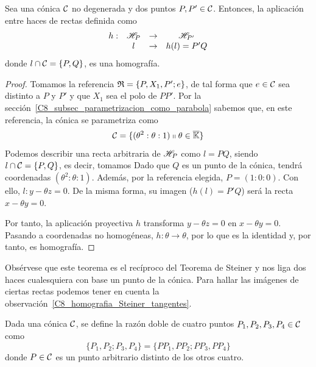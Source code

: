 \begin{theo}
	Sea una cónica $\mathcal{C}$ no degenerada y dos puntos $P,P'\in\mathcal{C}$. Entonces, la aplicación entre haces de rectas definida como
	\begin{equation}\label{C8_eq_teo_chasles}
		\begin{array}{cccc}
		h:& \mathscr{H}_P&\rightarrow &\mathscr{H}_{P'}\\
		& l&\rightarrow & h(l)=P'Q
		\end{array}
	\end{equation}
	donde $l\cap\mathcal{C}=\{P,Q\}$, es una homografía.
\end{theo}
\begin{proof}
	Tomamos la referencia $\mathfrak{R}=\{P,X_1,P';e\}$, de tal forma que $e\in\mathcal{C}$ sea distinto a $P$ y $P'$ y que $X_1$ sea el polo de $PP'$. Por la sección~\ref{C8_subsec_parametrizacion_como_parabola} sabemos que, en este referencia, la cónica se parametriza como
	\begin{equation*}
		\mathcal{C}=\{(\theta^2:\theta:1)\shortparallel\theta\in\overline{\mathbb{K}}\}
	\end{equation*}
	Podemos describir una recta arbitraria de $\mathscr{H}_P$ como $l=PQ$, siendo $l\cap\mathcal{C}=\{P,Q\}$, es decir, tomamos Dado que $Q$ es un punto de la cónica, tendrá coordenadas $(\theta^2:\theta:1)$. Además, por la referencia elegida, $P=(1:0:0)$. Con ello, $l:y-\theta z=0$. De la misma forma, su imagen ($h(l)=P'Q$) será la recta $x-\theta y=0$.
	
	Por tanto, la aplicación proyectiva $h$ transforma $y-\theta z=0$ en $x-\theta y=0$. Pasando a coordenadas no homogéneas, $h:\theta\rightarrow \theta$, por lo que es la identidad y, por tanto, es homografía.
\end{proof}
\begin{obs}
	Obsérvese que este teorema es el recíproco del Teorema de Steiner y nos liga dos haces cualesquiera con base un punto de la cónica. Para hallar las imágenes de ciertas rectas podemos tener en cuenta la observación~\ref{C8_homografia_Steiner_tangentes}.
\end{obs}
\begin{defi}\label{C8_def_razondoble}
	Dada una cónica $\mathcal{C}$, se define la razón doble de cuatro puntos $P_1,P_2,P_3,P_4\in\mathcal{C}$ como
	\begin{equation}
		\{P_1,P_2;P_3,P_4\}=\{PP_1,PP_2;PP_3,PP_4\}
	\end{equation}
	donde $P\in\mathcal{C}$ es un punto arbitrario distinto de los otros cuatro.
\end{defi}
